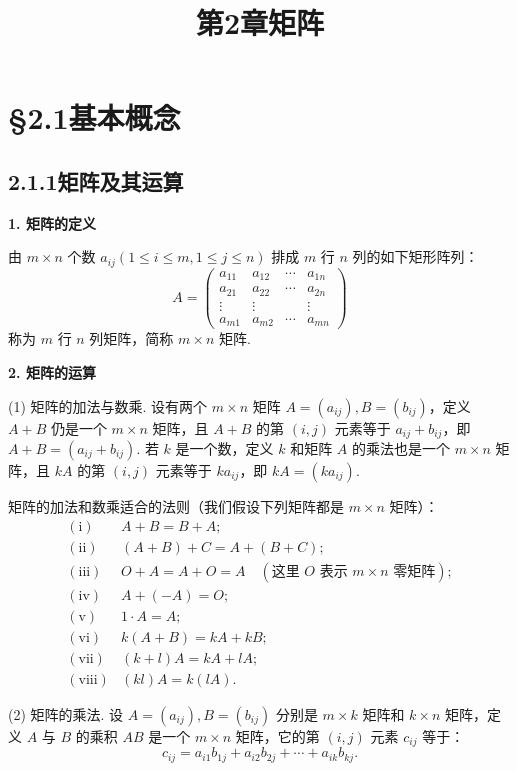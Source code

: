 \documentclass[UTF8,12pt,a4paper,fontset=fandol]{ctexart}
\title{第2章\quad 矩阵}
\author{}
\date{}
\begin{document}
\maketitle

\section*{§2.1\quad 基本概念}

\subsection*{2.1.1\quad 矩阵及其运算}

\noindent\textbf{1. 矩阵的定义}

由 $m\times n$ 个数 $a_{ij}(1\le i\le m,1\le j\le n)$ 排成 $m$ 行 $n$ 列的如下矩形阵列：
\[
A=
\left(
\begin{array}{cccc}
a_{11} & a_{12} & \cdots & a_{1n}\\
a_{21} & a_{22} & \cdots & a_{2n}\\
\vdots & \vdots & & \vdots\\
a_{m1} & a_{m2} & \cdots & a_{mn}
\end{array}
\right)
\]
称为 $m$ 行 $n$ 列矩阵，简称 $m\times n$ 矩阵.

\noindent\textbf{2. 矩阵的运算}

(1) 矩阵的加法与数乘. 设有两个 $m\times n$ 矩阵 $A=(a_{ij}),B=(b_{ij})$，定义 $A+B$ 仍是一个 $m\times n$ 矩阵，且 $A+B$ 的第 $(i,j)$ 元素等于 $a_{ij}+b_{ij}$，即 $A+B=(a_{ij}+b_{ij})$. 若 $k$ 是一个数，定义 $k$ 和矩阵 $A$ 的乘法也是一个 $m\times n$ 矩阵，且 $kA$ 的第 $(i,j)$ 元素等于 $ka_{ij}$，即 $kA=(ka_{ij})$.

矩阵的加法和数乘适合的法则（我们假设下列矩阵都是 $m\times n$ 矩阵）：
\[
\begin{array}{ll}
\mathrm{(i)} & A+B=B+A;\\
\mathrm{(ii)} & (A+B)+C=A+(B+C);\\
\mathrm{(iii)} & O+A=A+O=A\quad(\text{这里 }O\text{ 表示 }m\times n\text{ 零矩阵});\\
\mathrm{(iv)} & A+(-A)=O;\\
\mathrm{(v)} & 1\cdot A=A;\\
\mathrm{(vi)} & k(A+B)=kA+kB;\\
\mathrm{(vii)} & (k+l)A=kA+lA;\\
\mathrm{(viii)} & (kl)A=k(lA).
\end{array}
\]

(2) 矩阵的乘法. 设 $A=(a_{ij}),B=(b_{ij})$ 分别是 $m\times k$ 矩阵和 $k\times n$ 矩阵，定义 $A$ 与 $B$ 的乘积 $AB$ 是一个 $m\times n$ 矩阵，它的第 $(i,j)$ 元素 $c_{ij}$ 等于：
\[
c_{ij}=a_{i1}b_{1j}+a_{i2}b_{2j}+\cdots+a_{ik}b_{kj}.
\]
\end{document}
